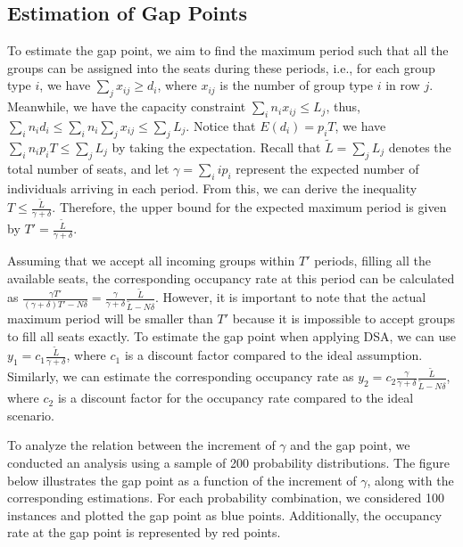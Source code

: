 \subsection{Estimation of Gap Points}
To estimate the gap point, we aim to find the maximum period such that all the groups can be assigned into the seats during these periods, i.e., for each group type $i$, we have $\sum_{j} x_{ij} \geq d_i$, where $x_{ij}$ is the number of group type $i$ in row $j$. Meanwhile, we have the capacity constraint $\sum_{i} n_{i} x_{ij} \leq L_j$, thus, $\sum_{i} n_i d_i \leq \sum_{i} n_i \sum_{j} x_{ij} \leq \sum_{j} L_{j}$. Notice that $E(d_i) = p_i T$, we have $\sum_{i} n_i p_i T \leq \sum_{j} L_{j}$ by taking the expectation. Recall that $\tilde{L} = \sum_{j} L_{j}$ denotes the total number of seats, and let $\gamma = \sum_{i} i p_i$ represent the expected number of individuals arriving in each period. From this, we can derive the inequality $T \leq \frac{\tilde{L}}{\gamma + \delta}$. Therefore, the upper bound for the expected maximum period is given by $T' = \frac{\tilde{L}}{\gamma + \delta}$.


Assuming that we accept all incoming groups within $T'$ periods, filling all the available seats, the corresponding occupancy rate at this period can be calculated as $\frac{\gamma T'}{(\gamma+ \delta)T' - N \delta} = \frac{\gamma}{\gamma +\delta} \frac{\tilde{L}}{\tilde{L}-N \delta}$. However, it is important to note that the actual maximum period will be smaller than $T{'}$ because it is impossible to accept groups to fill all seats exactly. To estimate the gap point when applying DSA, we can use $y_1 = c_1 \frac{\tilde{L}}{\gamma + \delta}$, where $c_1$ is a discount factor compared to the ideal assumption. Similarly, we can estimate the corresponding occupancy rate as $y_2 = c_2 \frac{\gamma}{\gamma +\delta} \frac{\tilde{L}}{\tilde{L}-N \delta}$, where $c_2$ is a discount factor for the occupancy rate compared to the ideal scenario.

To analyze the relation between the increment of $\gamma$ and the gap point, we conducted an analysis using a sample of 200 probability distributions. The figure below illustrates the gap point as a function of the increment of $\gamma$, along with the corresponding estimations. For each probability combination, we considered 100 instances and plotted the gap point as blue points. Additionally, the occupancy rate at the gap point is represented by red points.


